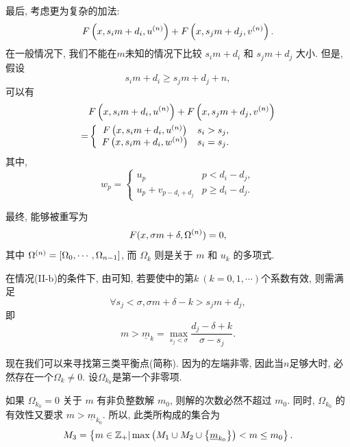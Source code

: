 最后, 考虑更为复杂的加法: 
\begin{equation}
F\left(x,s_i m+d_i,u^{(n)}\right)+F\left(x,s_j m+d_j,v^{(n)}\right).
\end{equation}
在一般情况下, 我们不能在$m$未知的情况下比较 $s_i m + d_i$ 和 $s_j m + d_j$ 大小. 但是, 假设
\begin{equation}
s_i m+d_i\ge s_j m+d_j+n, \label{cond_add}
\end{equation}
可以有 
\begin{equation}
\begin{split}
&F\left(x,s_i m+d_i,u^{(n)}\right)+F\left(x,s_j m+d_j,v^{(n)}\right) \\
=&\left\{
\begin{array}{cl}
    F\left(x,s_i m+d_i,u^{(n)}\right) & s_i>s_j,            \\
    F\left(x,s_i m+d_i,w^{(n)}\right) & s_i=s_j.
\end{array}
\right.
\end{split} \label{NEM-add}
\end{equation}
其中,
\begin{equation}
w_p=\left\{
\begin{array}{cl}
u_p               & p<d_i-d_j ,   \\
u_p+v_{p-d_i+d_j} & p\ge d_i-d_j.
\end{array}
\right.
\end{equation}

最终,  能够被重写为
\begin{equation}
F(x,\sigma m + \delta,\Omega^{(n)})=0, 
\label{eq-np}
\end{equation}
其中 $\Omega^{(n)}=\left[\Omega_0,\cdots,\Omega_{n-1}\right]$, 而 $\Omega_k$ 则是关于 $m$ 和 $u_k$ 的多项式.

在情况(II-b)的条件下, 由可知, 若要使中的第$k~(k=0,1,\cdots)$个系数有效, 则需满足 
\begin{equation}
\forall s_j<\sigma, \sigma m + \delta - k > s_j m + d_j,
\end{equation}
即
\begin{equation}
m > \underline{m}_k=\underset{s_j<\sigma}{\max}{\frac{d_j-\delta+k}{\sigma-s_j}}.
\end{equation}

现在我们可以来寻找第三类平衡点(简称\BPthree{}). 因为的左端非零, 因此当$n$足够大时, 必然存在一个$\Omega_k\neq 0$. 设$\Omega_{k_0}$是第一个非零项. 

如果 $\Omega_{k_0}=0$ 关于 $m$ 有非负整数解 $m_0$, 则解的次数必然不超过 $m_0$. 同时, $\Omega_{k_0}$ 的有效性又要求 $m>\underline{m}_{k_0}$. 所以, 此类\BPthree{}所构成的集合为 
\begin{equation}
M_3=\left\{m\in \mathbb Z_+|\max\left(M_1\cup M_2 \cup \left\{\underline{m}_{k_0}\right\}\right)<m\le m_0\right\}. \label{BP31}
\end{equation}

